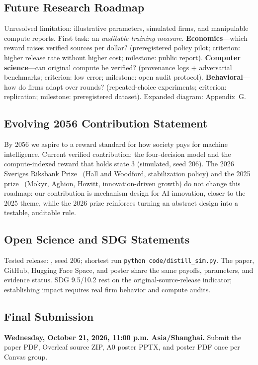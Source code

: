 \subsection*{Future Research Roadmap}
Unresolved limitation: illustrative parameters, simulated firms, and manipulable compute reports. First task: an \emph{auditable training measure}. \textbf{Economics}---which reward raises verified sources per dollar? (preregistered policy pilot; criterion: higher release rate without higher cost; milestone: public report). \textbf{Computer science}---can original compute be verified? (provenance logs + adversarial benchmarks; criterion: low error; milestone: open audit protocol). \textbf{Behavioral}---how do firms adapt over rounds? (repeated-choice experiments; criterion: replication; milestone: preregistered dataset). Expanded diagram: Appendix~G.

\subsection*{Evolving 2056 Contribution Statement}
By 2056 we aspire to a reward standard for how society pays for machine intelligence. Current verified contribution: the four-decision model and the compute-indexed reward that holds state 3 (simulated, seed 206). The 2026 Sveriges Riksbank Prize~\cite{nobel2026} (Hall and Woodford, stabilization policy) and the 2025 prize~\cite{nobel2025} (Mokyr, Aghion, Howitt, innovation-driven growth) do not change this roadmap: our contribution is mechanism design for AI innovation, closer to the 2025 theme, while the 2026 prize reinforces turning an abstract design into a testable, auditable rule.

\subsection*{Open Science and SDG Statements}
Tested release: , seed 206; shortest run \texttt{python code/distill\_sim.py}. The paper, GitHub, Hugging Face Space, and poster share the same payoffs, parameters, and evidence status. SDG 9.5/10.2 rest on the original-source-release indicator; establishing impact requires real firm behavior and compute audits.

\subsection*{Final Submission}
\textbf{Wednesday, October 21, 2026, 11:00 p.m. Asia/Shanghai.} Submit the paper PDF, Overleaf source ZIP, A0 poster PPTX, and poster PDF once per Canvas group.
